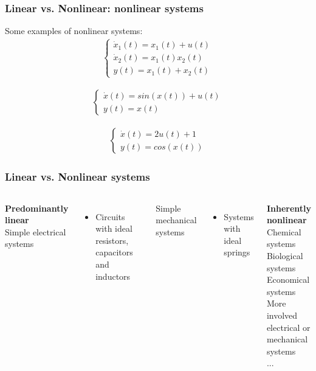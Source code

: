 \documentclass{beamer}
\begin{document}

\begin{frame}
\frametitle{Linear vs. Nonlinear: nonlinear systems}
Some examples of nonlinear systems:
\begin{align*}
\begin{cases}
\dot{x}_{1}(t) = x_{1}(t) + u(t)\\
\dot{x}_{2}(t) = x_{1}(t) x_{2}(t)\\
y(t) = x_{1}(t) + x_{2}(t)
\end{cases}
\end{align*}

\begin{align*}
\begin{cases}
\dot{x}(t) = sin(x(t)) + u(t)\\
y(t) = x(t)
\end{cases}
\end{align*}

\begin{align*}
\begin{cases}
\dot{x}(t) = 2 u(t) + 1\\
y(t) = cos(x(t))
\end{cases}
\end{align*}

\end{frame}


\begin{frame}
\frametitle{Linear vs. Nonlinear systems}
\vspace{-8ex}
\begin{columns}
\textbf{\Large{Predominantly linear}}\\
\medskip
Simple electrical systems
\begin{itemize}
\item Circuits with ideal resistors, capacitors and inductors
\end{itemize}
Simple mechanical systems
\begin{itemize}
\item Systems with ideal springs
\end{itemize}
\bigskip

\textbf{\Large{Inherently nonlinear}}\\
\medskip
Chemical systems\\
\smallskip
Biological systems\\
\smallskip
Economical systems\\
\smallskip
More involved electrical or mechanical systems\\
\smallskip
...
\end{columns}
\end{frame}
\end{document}
